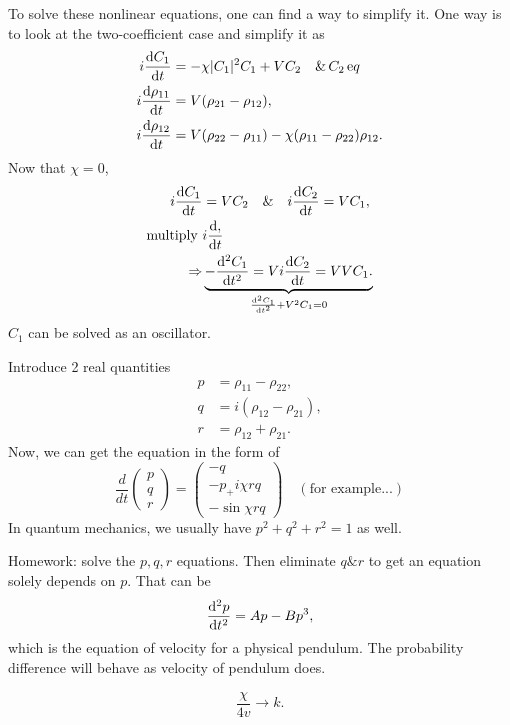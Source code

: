 To solve these nonlinear equations, one can find a way to simplify it. One way is to look at the two-coefficient case and simplify it as
\begin{align}
i\frac{{\mathrm d} {C_{1}}}{{\mathrm d}t} &=-\chi |C_1|^2 C_{1}+  V {C_2} \quad \&\, C_2 \,{\text eq}\\
i\frac{{\mathrm d} {\rho_{11}}}{{\mathrm d}t} &=V(\rho_{21}-\rho_{12}),\\
i\frac{{\mathrm d} {\rho_{12}}}{{\mathrm d}t} &=V(\rho_{22}-\rho_{11})-\chi (\rho _ {11}- \rho _{22})\rho_{12}.
\end{align} 
Now that $ \chi=0 $,
\begin{align}
i\frac{{\mathrm d} {C_1}}{{\mathrm d}t} &=V {C_2}\quad  \& \quad i\frac{{\mathrm d} {C_2}}{{\mathrm d}t}=VC_1,\\
\text{multiply } & i\frac{{\mathrm d} {,}}{{\mathrm d}t} \\
\Rightarrow & \underbrace{-\frac{{\mathrm d}^2 {C_1}}{{\mathrm d}t^2} = V i\frac{{\mathrm d} {C_2}}{{\mathrm d}t}=V V C_1.}_{ \frac{{\mathrm d}^2 {C_1}}{{\mathrm d}t^2}+V^2C_1=0}
\end{align}
$C_1$ can be solved as an oscillator. 

Introduce 2 real quantities
\begin{align}
p &=\rho_{11}-\rho_{22},\\
q &= i (\rho _{12}-\rho_{21}),\\
r &=  \rho _{12}+\rho_{21}.
\end{align}
Now, we can get the equation in the form of
\begin{equation}
\frac{d}{dt}\left({\begin{array}{c}
p \\ q \\ r
\end{array}}\right)= \left(\begin{array}{c}
-q \\ -p_+i \chi r q\\ -\sin\chi rq 
\end{array}
\right)\quad (\text{for example...})
\end{equation}
In quantum mechanics, we usually have $ p^2 + q^2 + r^2=1 $ as well.

Homework: solve the $p,q,r$ equations. Then eliminate $ q \& r $ to get an equation solely depends on $ p $. That can be 
\begin{equation}
\frac{{\mathrm d}^2 {p}}{{\mathrm d}t^2}=Ap-Bp^3 ,
\end{equation} 
which is the equation of velocity for a physical pendulum. The probability difference will behave as velocity of pendulum does. 

\begin{equation}
\frac{\chi}{4v}\rightarrow k.
\end{equation} 

